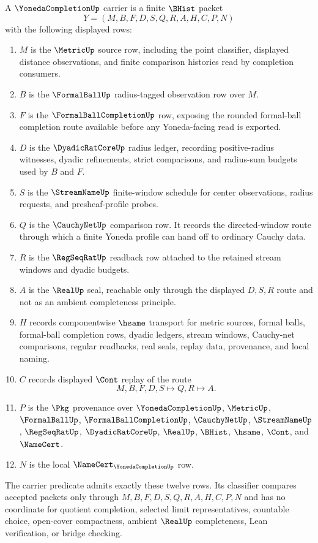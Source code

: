 \begin{definition}
\label{def:yoneda-completion-carrier}
A $\YonedaCompletionUp$ carrier is a finite $\BHist$ packet
$$
Y=(M,B,F,D,S,Q,R,A,H,C,P,N)
$$
with the following displayed rows:
\begin{enumerate}
\item $M$ is the $\MetricUp$ source row, including the point classifier, displayed distance observations, and finite comparison histories read by completion consumers.
\item $B$ is the $\FormalBallUp$ radius-tagged observation row over $M$.
\item $F$ is the $\FormalBallCompletionUp$ row, exposing the rounded formal-ball completion route available before any Yoneda-facing read is exported.
\item $D$ is the $\DyadicRatCoreUp$ radius ledger, recording positive-radius witnesses, dyadic refinements, strict comparisons, and radius-sum budgets used by $B$ and $F$.
\item $S$ is the $\StreamNameUp$ finite-window schedule for center observations, radius requests, and presheaf-profile probes.
\item $Q$ is the $\CauchyNetUp$ comparison row. It records the directed-window route through which a finite Yoneda profile can hand off to ordinary Cauchy data.
\item $R$ is the $\RegSeqRatUp$ readback row attached to the retained stream windows and dyadic budgets.
\item $A$ is the $\RealUp$ seal, reachable only through the displayed $D,S,R$ route and not as an ambient completeness principle.
\item $H$ records componentwise $\hsame$ transport for metric sources, formal balls, formal-ball completion rows, dyadic ledgers, stream windows, Cauchy-net comparisons, regular readbacks, real seals, replay data, provenance, and local naming.
\item $C$ records displayed $\Cont$ replay of the route
$$
M,B,F,D,S \longmapsto Q,R \longmapsto A .
$$
\item $P$ is the $\Pkg$ provenance over $\YonedaCompletionUp$, $\MetricUp$, $\FormalBallUp$, $\FormalBallCompletionUp$, $\CauchyNetUp$, $\StreamNameUp$, $\RegSeqRatUp$, $\DyadicRatCoreUp$, $\RealUp$, $\BHist$, $\hsame$, $\Cont$, and $\NameCert$.
\item $N$ is the local $\NameCert_{\YonedaCompletionUp}$ row.
\end{enumerate}
The carrier predicate admits exactly these twelve rows. Its classifier compares accepted packets only through $M,B,F,D,S,Q,R,A,H,C,P,N$ and has no coordinate for quotient completion, selected limit representatives, countable choice, open-cover compactness, ambient $\RealUp$ completeness, Lean verification, or bridge checking.
\end{definition}

